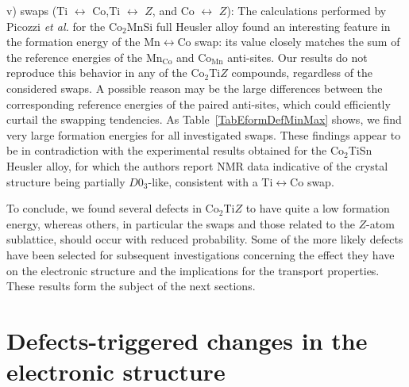 \documentclass[aps,prb,twocolumn,superscriptaddress,showpacs]{revtex4}
\newcommand{\ea}{{\it et al.}}
\begin{document}
v) swaps (Ti $\leftrightarrow$ Co,Ti $\leftrightarrow$ $Z$,
and Co $\leftrightarrow$ $Z$):
The calculations performed by Picozzi \ea\cite{PCF04}
for the Co$_2$MnSi full Heusler alloy found an
interesting feature in the formation energy 
of the Mn$\leftrightarrow$Co swap: its value closely
matches the sum of the reference energies of 
the Mn$_\text{Co}$ and Co$_\text{Mn}$ anti-sites.
Our results do not reproduce this behavior in
any of the Co$_2$Ti$Z$ compounds, regardless of
the considered swaps. A possible reason may be
the large differences between the corresponding
reference energies of the paired anti-sites, which
could efficiently curtail the swapping tendencies.
As Table~\ref{TabEformDefMinMax} shows, 
we find very large formation energies
for all investigated swaps. 
These findings appear to be in contradiction with
the experimental results obtained for
the Co$_2$TiSn Heusler alloy,\cite{KKW+07}
for which the authors report 
NMR data indicative of the crystal structure 
being partially $D0_3$-like, consistent
with a Ti$\leftrightarrow$Co swap.

To conclude, we found several defects in Co$_2$Ti$Z$ to have quite a
low formation energy, whereas others, in particular the swaps
and those related to the $Z$-atom sublattice, should
occur with reduced probability.
Some of the more likely 
defects have been selected for subsequent
investigations concerning the effect they have
on the electronic structure
and the implications for the transport properties.
These results form the subject of the next sections.

\section{Defects-triggered changes in the
electronic structure}\label{SecBSFalloys}
\end{document}
